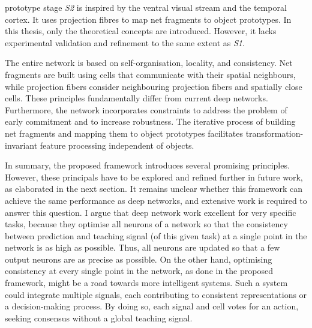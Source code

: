 \The prototype stage \emph{S2} is inspired by the ventral visual stream and the temporal cortex.
It uses projection fibres to map net fragments to object prototypes.
In this thesis, only the theoretical concepts are introduced. However, it lacks experimental validation and refinement to the same extent as \emph{S1}.

The entire network is based on self-organisation, locality, and consistency. Net fragments are built using cells that communicate with their spatial neighbours, while projection fibers consider neighbouring projection fibers and spatially close cells. These principles fundamentally differ from current deep networks.
Furthermore, the network  incorporates constraints to address the problem of early commitment and to increase robustness.
The iterative process of building net fragments and mapping them to object prototypes facilitates transformation-invariant feature processing independent of objects.

In summary, the proposed framework introduces several promising principles.
However, these principals have to be explored and refined further in future work, as elaborated in the next section.
It remains unclear whether this framework can achieve the same performance as deep networks, and extensive work is required to answer this question.
I argue that deep network work excellent for very specific tasks, because they optimise all neurons of a network so that the consistency between prediction and teaching signal (of this given task)
at a single point in the network is as high as possible.
Thus, all neurons are updated so that a few output neurons are as precise as possible.
On the other hand, optimising consistency at every single point in the network, as done in the proposed framework, might be a road towards more intelligent systems. Such a system could integrate multiple signals, each contributing to consistent representations or a decision-making process. By doing so, each signal and cell votes for an action, seeking consensus without a global teaching signal.



